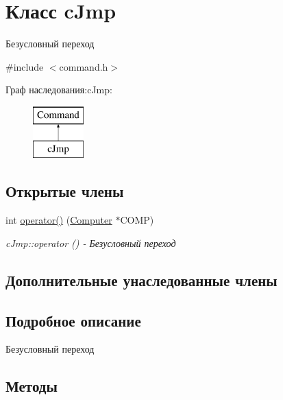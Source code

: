 \hypertarget{classc_jmp}{}\section{Класс c\+Jmp}
\label{classc_jmp}


Безусловный переход  




{\ttfamily \#include $<$command.\+h$>$}

Граф наследования\+:c\+Jmp\+:\begin{figure}[H]
\begin{center}
\leavevmode
\includegraphics[height=2.000000cm]{classc_jmp}
\end{center}
\end{figure}
\subsection*{Открытые члены}
\begin{DoxyCompactItemize}
\item 
int \hyperlink{classc_jmp_a0da6eb0f611e4793f72cf50a0d788689}{operator()} (\hyperlink{class_computer}{Computer} $\ast$C\+O\+MP)
\begin{DoxyCompactList}\small\item\em c\+Jmp\+::operator () -\/ Безусловный переход \end{DoxyCompactList}\end{DoxyCompactItemize}
\subsection*{Дополнительные унаследованные члены}


\subsection{Подробное описание}
Безусловный переход 

\subsection{Методы}
\hypertarget{classc_jmp_a0da6eb0f611e4793f72cf50a0d788689}{}\label{classc_jmp_a0da6eb0f611e4793f72cf50a0d788689} 
